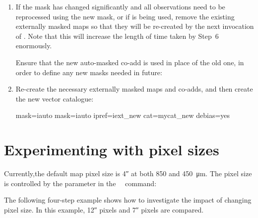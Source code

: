 \begin{enumerate}
\item If the mask has changed significantly and all observations need
  to be reprocessed using the new mask, or if  is being used,
  remove the existing externally masked maps so that they will be re-created by
  the next invocation of .  Note that this will increase the length of
  time taken by Step~6 enormously.

  Ensure that the new auto-masked co-add is used in place of the old one, in order to
  define any new masks needed in future:

\begin{terminalv}
\end{terminalv}

\item Re-create the necessary externally masked maps and co-adds, and
  then create the new vector catalogue:

\begin{terminalv}
     mask=iauto
     mask=iauto ipref=iext_new cat=mycat_new debias=yes
\end{terminalv}
\end{enumerate}


\section{Experimenting with pixel sizes}

Currently,the default map pixel size is 4\si{\arcsecond} at both
850 and \SI{450}{\micro\metre}. The pixel size is controlled by the
 parameter in the \smurf\ \poltwomap\ command:

\begin{terminalv}
\end{terminalv}


The following four-step example shows how to investigate the impact of
changing pixel size.  In this example, 12\si{\arcsecond}
pixels and 7\si{\arcsecond} pixels are compared.

